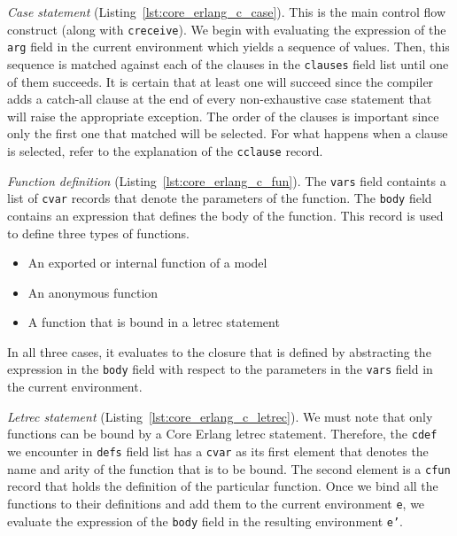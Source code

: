 \emph{Case statement} (Listing~\ref{lst:core_erlang_c_case}).
This is the main control flow construct (along with \texttt{c\textunderscore receive}). We begin with
evaluating the expression of the \texttt{arg} field in the current environment which
yields a sequence of values. Then, this sequence is matched against each of the
clauses in the \texttt{clauses} field list until one of them succeeds. It is certain
that at least one will succeed since the compiler adds a catch-all clause at
the end of every non-exhaustive case statement that will raise the appropriate
exception. The order of the clauses is important since only the first one that
matched will be selected. For what happens when a clause is selected, refer to
the explanation of the \texttt{c\textunderscore clause} record.



\emph{Function definition} (Listing~\ref{lst:core_erlang_c_fun}).
The \texttt{vars} field containts a list of \texttt{c\textunderscore var} records that denote the parameters of
the function. The \texttt{body} field contains an expression that defines the body of
the function. This record is used to define three types of functions.

\begin{itemize}
  \item An exported or internal function of a model
  \item An anonymous function
  \item A function that is bound in a letrec statement
\end{itemize}

In all three cases, it evaluates to the closure that is defined by abstracting
the expression in the \texttt{body} field with respect to the parameters in the \texttt{vars}
field in the current environment.



\emph{Letrec statement} (Listing~\ref{lst:core_erlang_c_letrec}).
We must note that only functions can be bound by a Core Erlang letrec
statement. Therefore, the \texttt{c\textunderscore def} we encounter in \texttt{defs} field list has a \texttt{c\textunderscore var} as
its first element that denotes the name and arity of the function that is to be
bound. The second element is a \texttt{c\textunderscore fun} record that holds the definition of the
particular function. Once we bind all the functions to their definitions and
add them to the current environment \texttt{e}, we evaluate the expression of the \texttt{body}
field in the resulting environment \texttt{e’}.

